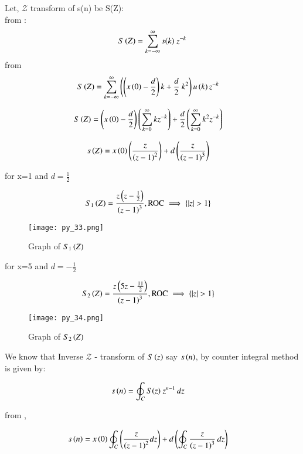 \documentclass[beamer]{IEEEtran}
\theoremstyle{remark}
\begin{document}
Let, $\mathcal{Z}$ transform of s(n) be S(Z):\\
from \brak{\ref{q11}}:
$$S\brak{Z}=\sum_{k=-\infty}^{\infty}s(k)\ z^{-k}$$
from \brak{\ref{q9}}
\begin{align}
S\brak{Z}&=\sum_{k=-\infty}^{\infty}\left(\brak{x\brak{0}-\frac{d}{2}}k+\frac{d}{2}\ k^2\right)u\brak{k}z^{-k}
\end{align}

\begin{align}
\label{q17}
    S\left(Z\right)&=\left(x\left(0\right)-\frac{d}{2}\right)\left(\sum_{k=0}^{\infty}kz^{-k}\right)+\frac{d}{2}\left(\sum_{k=0}^{\infty}k^2z^{-k}\right)
\end{align}

\begin{align}
\label{w1}
s\left(Z\right)&=x\left(0\right)\left(\frac{z}{\left(z-1\right)^2}\right)+d\left(\frac{z}{\left(z-1\right)^3}\right)
\end{align}

for x=1 and $d=\frac{1}{2}$

\begin{align}
S_1\brak{Z}&=\frac{z\brak{z-\frac{1}{2}}}{\brak{z-1}^3},\text{ROC}\implies\{|z|>1\}
\end{align}

\begin{figure}[h]
    \centering
    \texttt{[image: py\_33.png]}
    \label{fig:s1z}
    \caption*{Graph of $S_1\left(Z\right)$}
\end{figure}

for x=5 and $d=-\frac{1}{2}$

\begin{align}S_2\brak{Z}&=\frac{z\brak{5z-\frac{11}{2}}}{\brak{z-1}^3},\text{ROC}\implies\{|z|>1\}\end{align}

\begin{figure}[h]
    \centering
    \texttt{[image: py\_34.png]}
    \label{fig:s2z}
    \caption*{Graph of $S_2\left(Z\right)$}
\end{figure}

We know that Inverse $\mathcal{Z}$ - transform of $S\left(z\right)$ say $s\left(n\right)$, by counter integral method is given by:

\begin{align}
s\left(n\right)&=\oint_C S(z)\ z^{n-1}\, dz
\end{align}

from \brak{\ref{w1}},

\begin{align}
    s\left(n\right)&=x\left(0\right)\oint_C \left(\frac{z}{\left(z-1\right)^2}dz\right) + d\left(\oint_C  \frac{z}{\left(z-1\right)^3} \, dz\right)
\end{align}
\end{document}
